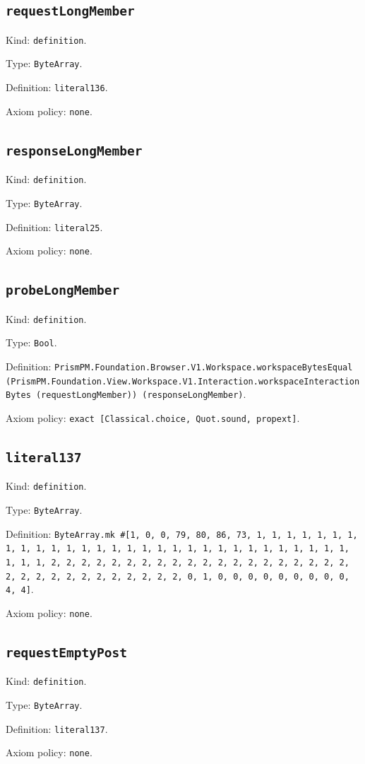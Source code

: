 \documentclass[11pt]{article}
\begin{document}
\subsection*{\texttt{requestLongMember}}
\noindent Kind: \texttt{definition}.\par
\noindent Type: \texttt{ByteArray}.\par
\noindent Definition: \texttt{literal136}.\par
\noindent Axiom policy: \texttt{none}.\par
\subsection*{\texttt{responseLongMember}}
\noindent Kind: \texttt{definition}.\par
\noindent Type: \texttt{ByteArray}.\par
\noindent Definition: \texttt{literal25}.\par
\noindent Axiom policy: \texttt{none}.\par
\subsection*{\texttt{probeLongMember}}
\noindent Kind: \texttt{definition}.\par
\noindent Type: \texttt{Bool}.\par
\noindent Definition: \texttt{PrismPM.Foundation.Browser.V1.Workspace.workspaceBytesEqual (PrismPM.Foundation.View.Workspace.V1.Interaction.workspaceInteractionBytes (requestLongMember)) (responseLongMember)}.\par
\noindent Axiom policy: \texttt{exact [Classical.choice, Quot.sound, propext]}.\par
\subsection*{\texttt{literal137}}
\noindent Kind: \texttt{definition}.\par
\noindent Type: \texttt{ByteArray}.\par
\noindent Definition: \texttt{ByteArray.mk \#[1, 0, 0, 79, 80, 86, 73, 1, 1, 1, 1, 1, 1, 1, 1, 1, 1, 1, 1, 1, 1, 1, 1, 1, 1, 1, 1, 1, 1, 1, 1, 1, 1, 1, 1, 1, 1, 1, 1, 1, 2, 2, 2, 2, 2, 2, 2, 2, 2, 2, 2, 2, 2, 2, 2, 2, 2, 2, 2, 2, 2, 2, 2, 2, 2, 2, 2, 2, 2, 2, 2, 2, 0, 1, 0, 0, 0, 0, 0, 0, 0, 0, 0, 4, 4]}.\par
\noindent Axiom policy: \texttt{none}.\par
\subsection*{\texttt{requestEmptyPost}}
\noindent Kind: \texttt{definition}.\par
\noindent Type: \texttt{ByteArray}.\par
\noindent Definition: \texttt{literal137}.\par
\noindent Axiom policy: \texttt{none}.\par
\end{document}
